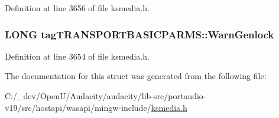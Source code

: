 Definition at line 3656 of file ksmedia.\+h.

\subsubsection[{\texorpdfstring{Warn\+Genlock}{WarnGenlock}}]{\setlength{\rightskip}{0pt plus 5cm}L\+O\+NG tag\+T\+R\+A\+N\+S\+P\+O\+R\+T\+B\+A\+S\+I\+C\+P\+A\+R\+M\+S\+::\+Warn\+Genlock}\hypertarget{structtag_t_r_a_n_s_p_o_r_t_b_a_s_i_c_p_a_r_m_s_acca16909113e8958fdcb97b38e1dd0e9}{}\label{structtag_t_r_a_n_s_p_o_r_t_b_a_s_i_c_p_a_r_m_s_acca16909113e8958fdcb97b38e1dd0e9}


Definition at line 3654 of file ksmedia.\+h.



The documentation for this struct was generated from the following file\+:\begin{DoxyCompactItemize}
\item 
C\+:/\+\_\+dev/\+Open\+U/\+Audacity/audacity/lib-\/src/portaudio-\/v19/src/hostapi/wasapi/mingw-\/include/\hyperlink{ksmedia_8h}{ksmedia.\+h}\end{DoxyCompactItemize}
